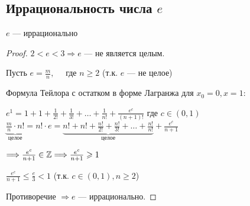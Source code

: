 \subsection{Иррациональность числа $e$ \href{https://youtu.be/au9-34CerJM?t=7867}{\Walley}}

\begin{theorem-non}
    $e$ --- иррационально    

    \begin{proof}
        $2 < e < 3 \Longrightarrow e$ --- не является целым.
        
        Пусть $e = \frac{m}{n}, \quad$ где $n \geqslant 2$ (т.к. $e$ --- не целое)
        
        Формула Тейлора с остатком в форме Лагранжа для $x_0 = 0, x = 1:$
        \begin{center}
            $e^1 = 1 + 1 + \frac{1}{2!} + \frac{1}{3!} + \dots + \frac{1}{n!} + \frac{e^c}{(n+1)!}$ где $c \in (0,1)$ \\
            $\underbrace{\frac{m}{n} \cdot n!}_{\text{целое}} = n! \cdot e = 
            \underbrace{n! + n! + \frac{n!}{2!} + \frac{n!}{3!} + \dots + \frac{n!}{n!}}_{\text{целое}} + \frac{e^c}{n+1}$

            $\Longrightarrow \frac{e^c}{n+1} \in \mathbb{Z} \Longrightarrow \frac{e^c}{n+1} \geqslant 1$ 

            $\frac{e^c}{n + 1} \leqslant \frac{e}{3} < 1$ (т.к. $c \in (0,1), n \geqslant 2$) 
        \end{center}
        Противоречие $\Longrightarrow e$ --- иррационально. 

    \end{proof}

\end{theorem-non}